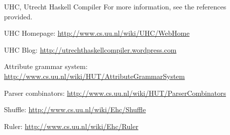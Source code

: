 \begin{hcarentry}{UHC, Utrecht Haskell Compiler}
For more information, see the references provided.

\FurtherReading
\begin{compactitem}
\item UHC Homepage:
\url{http://www.cs.uu.nl/wiki/UHC/WebHome}

\item UHC Blog:
\url{http://utrechthaskellcompiler.wordpress.com}

\item Attribute grammar system:
\url{http://www.cs.uu.nl/wiki/HUT/AttributeGrammarSystem}

\item Parser combinators:
\url{http://www.cs.uu.nl/wiki/HUT/ParserCombinators}

\item Shuffle:
\url{http://www.cs.uu.nl/wiki/Ehc/Shuffle}

\item Ruler:
\url{http://www.cs.uu.nl/wiki/Ehc/Ruler}
\end{compactitem}
\end{hcarentry}
